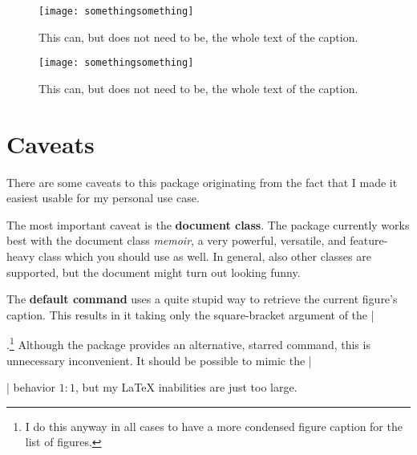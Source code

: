 \documentclass[article,oneside]{memoir}  %
\begin{document}
\begin{figure}[h]
	\centering
	\texttt{[image: somethingsomething]}
	\caption{ This can, but does not need to be, the whole text of the caption.}
\end{figure}


\begin{codeLATEXblock}
\begin{figure}[h]
	\centering
	\texttt{[image: somethingsomething]}
	\caption{ This can, but does not need to be, the whole text of the caption.
	}
\end{figure}
\end{codeLATEXblock}

\section{Caveats} %
\label{sec:caveats}
There are some caveats to this package originating from the fact that I made it easiest usable for my personal use case.

The most important caveat is the \textbf{document class}. The package currently works best with the document class \emph{memoir}, a very powerful, versatile, and feature-heavy class which you should use as well. In general, also other classes are supported, but the document might turn out looking funny.

The \textbf{default command} uses a quite stupid way to retrieve the current figure's caption. This results in it taking only the square-bracket argument of the \codeLATEX|\caption|.\footnote{I do this anyway in all cases to have a more condensed figure caption for the list of figures.} Although the package provides an alternative, starred command, this is unnecessary inconvenient. It should be possible to mimic the \codeLATEX|\listoffigures| behavior $1:1$, but my \LaTeX{} inabilities are just too large.


\listofreleaseplots
\label{lorp}

\end{document}
